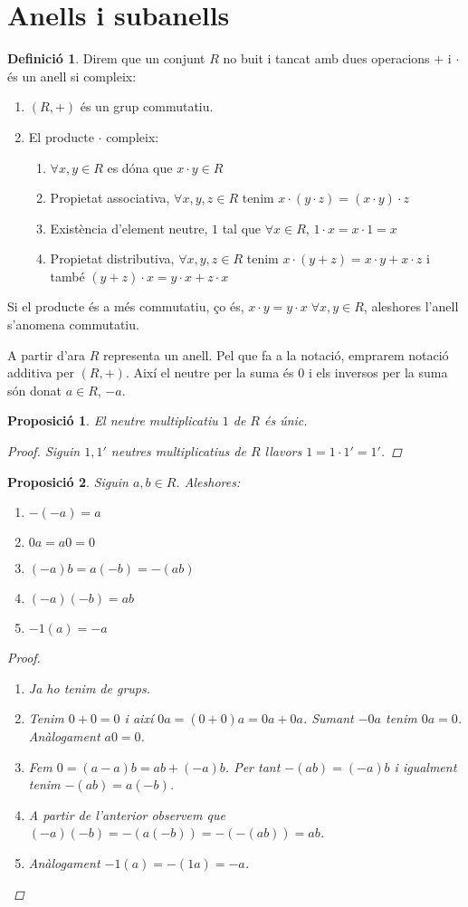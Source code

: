 \documentclass[a4paper,11pt]{report}
\theoremstyle{theorem}
\newtheorem{proposicio}{\normalfont \sffamily\bfseries Proposició}[section]
\theoremstyle{definition}
\newtheorem{definicio}{\normalfont\sffamily\bfseries Definició}[section]
\begin{document}
\section{Anells i subanells}
\begin{definicio} 
	Direm que un conjunt $R$ no buit i tancat amb dues operacions $+$ i $\cdot$ és un anell si compleix:
	\begin{enumerate}
		\item $(R,+)$ és un grup commutatiu.
		\item El producte $\cdot $ compleix:
		
		\begin{enumerate}[label=\roman*.]
			
			\item $\forall x,y\in R$ es dóna que $x\cdot y\in R$
			\item Propietat associativa, $\forall x,y,z\in R$ tenim $x\cdot(y\cdot z)=(x\cdot y)\cdot z$
			\item Existència d'element neutre, $1$ tal que $\forall x\in R$, $1\cdot x=x\cdot 1=x$
			\item Propietat distributiva, $\forall x,y,z\in R$ tenim $x\cdot(y+z)=x\cdot y+x\cdot z$ i també $(y+z)\cdot x=y\cdot x+z\cdot x$
		\end{enumerate}
	\end{enumerate}
Si el producte és a més commutatiu, ço és, $x\cdot y=y\cdot x\;\forall x,y\in R$, aleshores l'anell s'anomena commutatiu.
\end{definicio}
A partir d'ara $R$ representa un anell. Pel que fa a la notació, emprarem notació additiva per $(R,+)$. Així el neutre per la suma és $0$ i els inversos per la suma són donat $a\in R$, $-a$.
\begin{proposicio}
	El neutre multiplicatiu $1$ de $R$ és únic.
	\begin{proof}
		Siguin $1,1'$ neutres multiplicatius de $R$ llavors $1=1\cdot1'=1'$.
	\end{proof}
\end{proposicio}
\begin{proposicio}
Siguin $a,b\in R$. Aleshores:
\begin{enumerate}
\item $-(-a)=a$
\item $0a=a0=0$
\item $(-a)b=a(-b)=-(ab)$
\item $(-a)(-b)=ab$
\item $-1(a)=-a$
\end{enumerate}
\begin{proof}
	\begin{enumerate}
		\item Ja ho tenim de grups.
		\item Tenim $0+0=0$ i així $0a=(0+0)a=0a+0a$. Sumant $-0a$ tenim $0a=0$. Anàlogament $a0=0$.
		\item Fem $0=(a-a)b=ab+(-a)b$. Per tant $-(ab)=(-a)b$ i igualment tenim $-(ab)=a(-b)$.
		\item A partir de l'anterior observem que $(-a)(-b)=-(a(-b))=-(-(ab))=ab$.
		\item Anàlogament $-1(a)=-(1a)=-a$.
	\end{enumerate}
\end{proof}
\end{proposicio}
\end{document}

